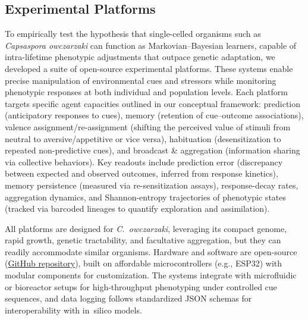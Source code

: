 \documentclass[aps,pre,twocolumn,floatfix,nofootinbib,amsmath,amssymb]{revtex4-2}
\begin{document}
\subsection{Experimental Platforms}

To empirically test the hypothesis that single-celled organisms such as \textit{Capsaspora owczarzaki} can function as Markovian–Bayesian learners, capable of intra-lifetime phenotypic adjustments that outpace genetic adaptation, we developed a suite of open-source experimental platforms. These systems enable precise manipulation of environmental cues and stressors while monitoring phenotypic responses at both individual and population levels. Each platform targets specific agent capacities outlined in our conceptual framework: prediction (anticipatory responses to cues), memory (retention of cue–outcome associations), valence assignment/re-assignment (shifting the perceived value of stimuli from neutral to aversive/appetitive or vice versa), habituation (desensitization to repeated non-predictive cues), and broadcast \& aggregation (information sharing via collective behaviors). Key readouts include prediction error (discrepancy between expected and observed outcomes, inferred from response kinetics), memory persistence (measured via re-sensitization assays), response-decay rates, aggregation dynamics, and Shannon-entropy trajectories of phenotypic states (tracked via barcoded lineages to quantify exploration and assimilation).

All platforms are designed for \textit{C.\ owczarzaki}, leveraging its compact genome, rapid growth, genetic tractability, and facultative aggregation, but they can readily accommodate similar organisms. Hardware and software are open-source (\href{https://example.com}{GitHub repository}), built on affordable microcontrollers (e.g., ESP32) with modular components for customization. The systems integrate with microfluidic or bioreactor setups for high-throughput phenotyping under controlled cue sequences, and data logging follows standardized JSON schemas for interoperability with in~silico models.
\end{document}
